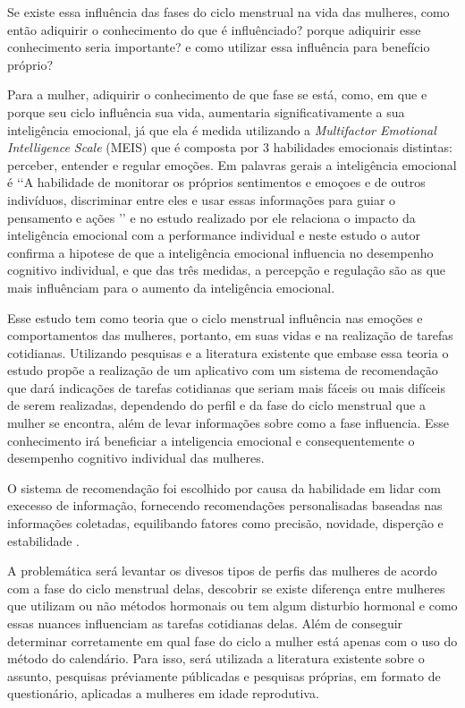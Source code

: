 Se existe essa influência das fases do ciclo menstrual na vida das mulheres, como então adiquirir o conhecimento do que é influênciado? porque adiquirir esse conhecimento seria importante? e como utilizar essa influência para benefício próprio?

Para a mulher, adiquirir o conhecimento de que fase se está, como, em que e porque seu ciclo influência sua vida, aumentaria significativamente a sua inteligência emocional, já que ela é medida utilizando a \textit{Multifactor Emotional Intelligence Scale} (MEIS) que é composta por 3 habilidades emocionais distintas: perceber, entender e regular emoções. Em palavras gerais a inteligência emocional é \lq \lq A habilidade de monitorar os próprios sentimentos e emoçoes e de outros indivíduos, discriminar entre eles e usar essas informações para guiar o pensamento e ações \rq \rq \cite{salovey1990} e no estudo realizado por  ele relaciona o impacto da inteligência emocional com a performance individual e neste estudo o autor confirma a hipotese de que a inteligência emocional influencia no desempenho cognitivo individual, e que das três medidas, a percepção e regulação são as que mais influênciam para o aumento da inteligência emocional.

Esse estudo tem como teoria que o ciclo menstrual influência nas emoções e comportamentos das mulheres, portanto, em suas vidas e na realização de tarefas cotidianas. Utilizando pesquisas e a literatura existente que embase essa teoria o estudo propõe a realização de um aplicativo com um sistema de recomendação que dará indicações de tarefas cotidianas que seriam mais fáceis ou mais difíceis de serem realizadas, dependendo do perfil e da fase do ciclo menstrual que a mulher se encontra, além de levar informações sobre como a fase influencia. Esse conhecimento irá beneficiar a inteligencia emocional e consequentemente o desempenho cognitivo individual das mulheres.

O sistema de recomendação foi escolhido por causa da habilidade em lidar com execesso de informação, fornecendo recomendações personalisadas baseadas nas informações coletadas, equilibando fatores como precisão, novidade, disperção e estabilidade \cite{bobadilla2013}.

A problemática será levantar os divesos tipos de perfis das mulheres de acordo com a fase do ciclo menstrual delas, descobrir se existe diferença entre mulheres que utilizam ou não métodos hormonais ou tem algum disturbio hormonal e como essas nuances influenciam as tarefas cotidianas delas. Além de conseguir determinar corretamente em qual fase do ciclo a mulher está apenas com o uso do método do calendário. Para isso, será utilizada a literatura existente sobre o assunto, pesquisas préviamente públicadas e pesquisas próprias, em formato de questionário, aplicadas a mulheres em idade reprodutiva.

